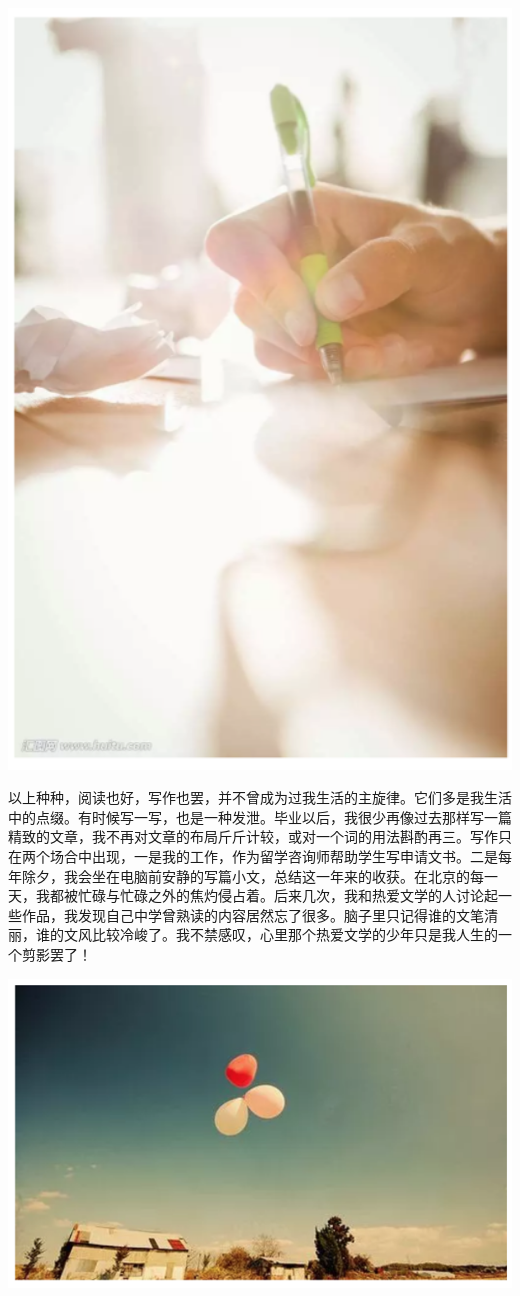 \documentclass[]{book}
\begin{document}
\includegraphics[width=5.51in]{images/dream2}

以上种种，阅读也好，写作也罢，并不曾成为过我生活的主旋律。它们多是我生活中的点缀。有时候写一写，也是一种发泄。毕业以后，我很少再像过去那样写一篇精致的文章，我不再对文章的布局斤斤计较，或对一个词的用法斟酌再三。写作只在两个场合中出现，一是我的工作，作为留学咨询师帮助学生写申请文书。二是每年除夕，我会坐在电脑前安静的写篇小文，总结这一年来的收获。在北京的每一天，我都被忙碌与忙碌之外的焦灼侵占着。后来几次，我和热爱文学的人讨论起一些作品，我发现自己中学曾熟读的内容居然忘了很多。脑子里只记得谁的文笔清丽，谁的文风比较冷峻了。我不禁感叹，心里那个热爱文学的少年只是我人生的一个剪影罢了！

\includegraphics[width=8.33in]{images/dream3}
\end{document}
